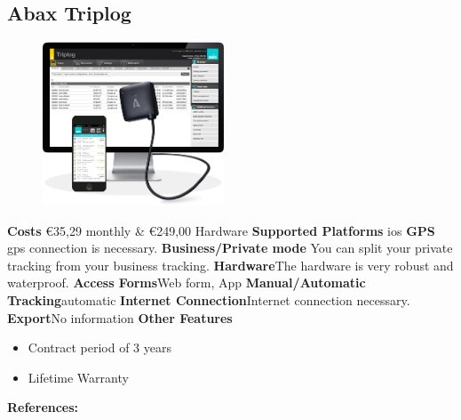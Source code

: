 \begin{singlespace}
\section{Abax Triplog}
\begin{figure}
  \begin{center}
    \includegraphics[width=0.48\textwidth]{bilder/abax}
  \end{center}
\end{figure}
\textbf{Costs} \euro 35,29 monthly \& \euro 249,00 Hardware
\newline\newline
\textbf{Supported Platforms} \gls{ios}
\newline\newline
\textbf{GPS} \gls{gps} connection is necessary.
\newline\newline
\textbf{Business/Private mode} You can split your private tracking from your business tracking.
\newline\newline
\textbf{Hardware}The hardware is very robust and waterproof.
\newline\newline
\textbf{Access Forms}Web form, App
\newline\newline
\textbf{Manual/Automatic Tracking}automatic
\newline\newline
\textbf{Internet Connection}Internet connection necessary.
\newline\newline
\textbf{Export}No information
\newline\newline
\textbf{Other Features} 
\begin{itemize}
\item Contract period of 3 years
\item Lifetime Warranty
\end{itemize}
\textbf{References:} \cite{Abax_Triplog}
\newpage


\end{singlespace}
